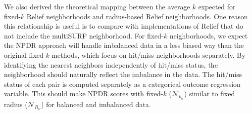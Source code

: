 \documentclass[10pt]{article}
\begin{document}

%


We also derived the theoretical mapping between the average $k$ expected for fixed-$k$ Relief neighborhoods and radius-based Relief neighborhoods. One reason this relationship is useful is to compare with implementations of Relief that do not include the multiSURF neighborhood. For fixed-$k$ neighborhoods, we expect the NPDR approach will handle imbalanced data in a less biased way than the original fixed-$k$ methods, which focus on hit/miss neighborhoods separately. By identifying the nearest neighbors independently of hit/miss status, the neighborhood should naturally reflect the imbalance in the data. The hit/miss status of each pair is computed separately as a categorical outcome regression variable. This should make NPDR scores with fixed-$k$ ($\mathcal{N}_{k_\alpha}$) similar to fixed radius ($\mathcal{N}_{R_\alpha}$) for balanced and imbalanced data.    
\end{document}
